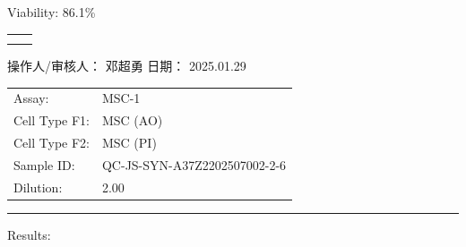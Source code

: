 \documentclass[UTF8,10pt,a4paper,fontset=fandol]{ctexart}
\newcommand{\fieldvalue}[1]{#1}
\newcommand{\handwritten}[1]{#1}
\begin{document}
\begin{center}
\begin{center}
\medskip
\noindent Viability:
\fieldvalue{86.1\%}

\medskip
\noindent
\begin{tabular}{cc}
\fbox{\rule{0pt}{0.22\textheight}\rule{0.43\textwidth}{0pt}}
&
\fbox{\rule{0pt}{0.22\textheight}\rule{0.43\textwidth}{0pt}}
\\[1em]
\fbox{\rule{0pt}{0.22\textheight}\rule{0.43\textwidth}{0pt}}
&
\fbox{\rule{0pt}{0.22\textheight}\rule{0.43\textwidth}{0pt}}
\end{tabular}

\vfill

\noindent
操作人/审核人：
\fieldvalue{\handwritten{邓超勇}}
\hfill
日期：
\fieldvalue{\handwritten{2025.01.29}}

\newpage

\noindent
\begin{tabular}{@{}ll@{}}
Assay:
&
\fieldvalue{MSC-1}
\\[3pt]
Cell Type F1:
&
\fieldvalue{MSC (AO)}
\\[3pt]
Cell Type F2:
&
\fieldvalue{MSC (PI)}
\\[3pt]
Sample ID:
&
\fieldvalue{QC-JS-SYN-A37Z2202507002-2-6}
\\[3pt]
Dilution:
&
\fieldvalue{2.00}
\end{tabular}

\vspace{8pt}
\hrule
\vspace{3pt}

\noindent Results:

\vspace{6pt}


\end{center}
\end{center}
\end{document}
